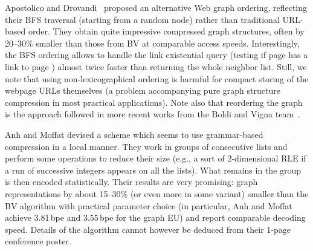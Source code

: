 \documentclass[envcountsame]{llncs}
\begin{document}
Apostolico and Drovandi~\cite{AD09} proposed an alternative Web graph 
ordering, reflecting their BFS traversal (starting from a random node) rather 
than traditional URL-based order.
They obtain quite impressive compressed graph structures, often by 20--30\% smaller 
than those from BV at comparable access speeds.
Interestingly, the BFS ordering allows to handle the link existential query 
(testing if page  has a link to page ) almost twice faster than returning 
the whole neighbor list.
Still, we note that using non-lexicographical ordering is harmful 
for compact storing of the webpage URLs themselves (a problem accompanying pure 
graph structure compression in most practical applications).
Note also that reordering the graph is the approach followed in more recent 
works from the Boldi and Vigna team~\cite{BSV09,BoldiRSV11}.

Anh and Moffat \cite{DBLP:conf/dcc/AnhM10} devised a scheme which seems to use 
grammar-based compression in a local manner. They work in groups of  consecutive 
lists and perform some operations to reduce their size (e.g., a sort of 2-dimensional 
RLE if a run of successive integers appears on all the  lists).  What remains 
in the group is then encoded statistically.  Their results are very promising: 
graph representations by about 15--30\% (or even more in some variant) smaller 
than the BV algorithm with practical parameter choice (in particular, 
Anh and Moffat achieve 3.81\,bpe and 3.55\,bpe for the graph EU) and report 
comparable decoding speed.
Details of the algorithm cannot however be deduced 
from their 1-page conference poster.
\end{document}
